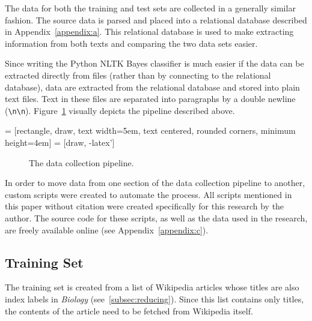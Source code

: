 The data for both the training and test sets are collected in a generally similar fashion.
The source data is parsed and placed into a relational database described in Appendix~\ref{appendix:a}.
This relational database is used to make extracting information from both texts and comparing the two data sets easier.

\noindent Since writing the Python NLTK \naive Bayes classifier is much easier if the data can be extracted directly from files (rather than by connecting to the relational database), data are extracted from the relational database and stored into plain text files.
Text in these files are separated into paragraphs by a double newline ({\tt \textbackslash n\textbackslash n}).
Figure~\ref{fig:pipeline} visually depicts the pipeline described above.

 = [rectangle, draw, 
    text width=5em, text centered, rounded corners, minimum height=4em]
 = [draw, -latex']

\begin{figure}[H]
\begin{center}
\caption{The data collection pipeline.}
\label{fig:pipeline}
\end{center}
\end{figure}

In order to move data from one section of the data collection pipeline to another, custom scripts were created to automate the process.
All scripts mentioned in this paper without citation were created specifically for this research by the author.
The source code for these scripts, as well as the data used in the research, are freely available online (see Appendix~\ref{appendix:c}).

\subsection{Training Set}
\label{subsec:training-set}

The training set is created from a list of Wikipedia articles whose titles are also index labels in {\it Biology} (see~\ref{subsec:reducing}).
Since this list contains only titles, the contents of the article need to be fetched from Wikipedia itself.

